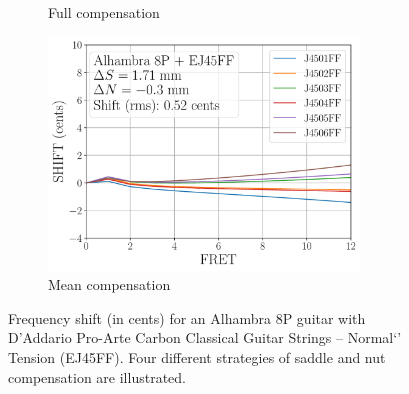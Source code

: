 \begin{figure}
\begin{subfigure}[b]{0.45\textwidth}
   \caption{Full compensation}
   \label{fig:shift_alhambra8p_ej45ff_full}
  \end{subfigure}
  \hspace{0.25in}
  \begin{subfigure}[b]{0.45\textwidth}
   \centering
   \includegraphics[width=3.25in]{../figures/shift_alhambra8p_ej45ff_mean}
   \caption{Mean compensation}
   \label{fig:shift_alhambra8p_ej45ff_mean}
  \end{subfigure}
  \caption{\label{fig:compensation_alhambra8p_ej45ff} Frequency shift (in cents) for an Alhambra 8P guitar with D'Addario Pro-Arte Carbon Classical Guitar Strings -- Normal`' Tension (EJ45FF). Four different strategies of saddle and nut compensation are illustrated.}
\end{figure}
